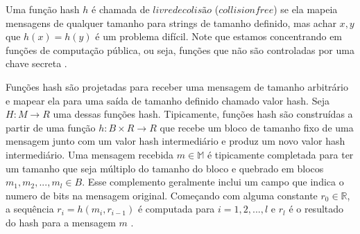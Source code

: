 \documentclass[12pt]{article}
\begin{document}
Uma função hash \(h\) é chamada de \(livre de colisão\) (\(collision free\)) se ela mapeia mensagens
de qualquer tamanho para strings de tamanho definido, mas achar \(x, y\) que \(h(x) = h(y)\) é um
problema difícil. Note que estamos concentrando em funções de computação pública, ou seja, funções
que não são controladas por uma chave secreta \cite{damgaard1989design}.


Funções hash são projetadas para receber uma mensagem de tamanho arbitrário e mapear ela para uma 
saída de tamanho definido chamado valor hash. Seja \(H : M \to R\) uma dessas funções hash. Tipicamente,
funções hash são construídas a partir de uma função \(h: B \times R \to R\) que recebe um bloco de tamanho
fixo de uma mensagem junto com um valor hash intermediário e produz um novo valor hash intermediário. Uma
mensagem recebida \(m \in \mathbb{M}\) é tipicamente completada para ter um tamanho que seja múltiplo do
tamanho do bloco e quebrado em blocos \(m_1, m_2, ... , m_l \in B\). Esse complemento geralmente inclui um
campo que indica o numero de bits na mensagem original. Começando com alguma constante \(r_0 \in \mathbb{R}\),
a sequência \(r_i = h(m_i, r_{i-1})\) é computada para \(i = 1, 2, ... , l\) e \(r_l\) é o resultado do hash
para a mensagem \(m\) \cite{van1999parallel}.

\end{document}
